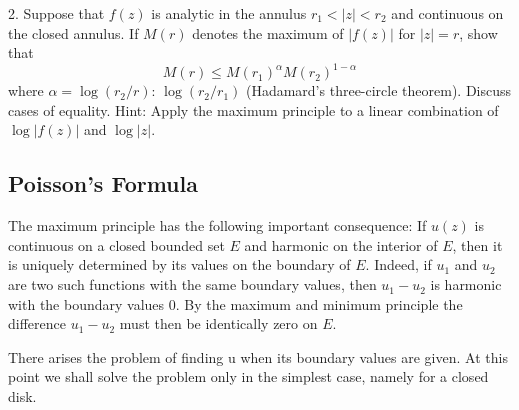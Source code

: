 2. Suppose that $f(z)$ is analytic in the annulus $r_{1} < |z| < r_{2}$ and continuous on the closed annulus. If $M(r)$ denotes the maximum of $|f(z)|$ for $|z| = r$, show that
\begin{equation*}
M (r) \leq M (r _ {1}) ^ {\alpha} M (r _ {2}) ^ {1 - \alpha}
\end{equation*}
where $\alpha = \log (r_{2}/r)$: $\log (r_{2}/r_{1})$ (Hadamard's three-circle theorem). Discuss cases of equality. Hint: Apply the maximum principle to a linear combination of $\log |f(z)|$ and $\log |z|$.

\setcounter{section}{6}\setcounter{subsection}{2}\subsection{Poisson's Formula}\label{sec:4.6.3}
The maximum principle has the following important consequence: If $u(z)$ is continuous on a closed bounded set $E$ and harmonic on the interior of $E$, then it is uniquely determined by its values on the boundary of $E$. Indeed, if $u_1$ and $u_2$ are two such functions with the same boundary values, then $u_1 - u_2$ is harmonic with the boundary values 0. By the maximum and minimum principle the difference $u_1 - u_2$ must then be identically zero on $E$.

There arises the problem of finding u when its boundary values are given. At this point we shall solve the problem only in the simplest case, namely for a closed disk.

